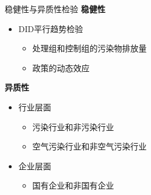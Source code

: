 \documentclass[11pt,compress,xcolor=x11names,UTF8]{beamer}
\begin{document}
	\begin{frame}{稳健性与异质性检验}
		\textbf{稳健性}
		\begin{itemize}
			\item DID平行趋势检验
			\begin{itemize}
				\item 处理组和控制组的污染物排放量
				\item 政策的动态效应
			\end{itemize}
		\end{itemize}
		\textbf{异质性}
		\begin{itemize}
			\item 行业层面
			\begin{itemize}
				\item 污染行业和非污染行业
				\item 空气污染行业和非空气污染行业
			\end{itemize}
		\item 企业层面
		\begin{itemize}
			\item 国有企业和非国有企业
		\end{itemize}
		\end{itemize}
	\end{frame}


	\begin{frame}
	\end{frame}
\end{document}
